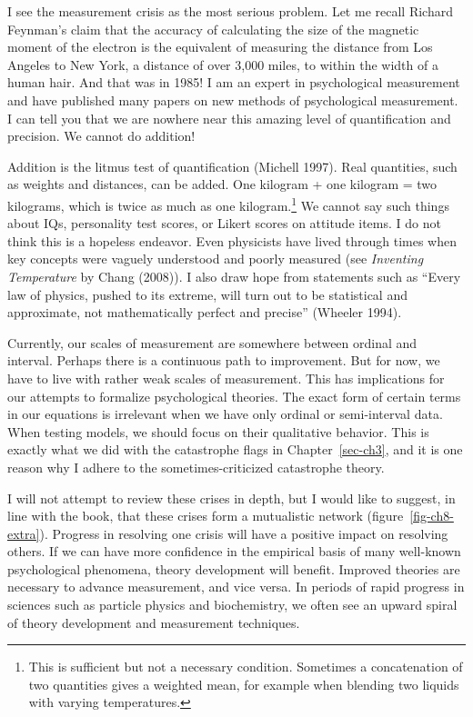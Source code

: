 \documentclass[
  a4paper,
  DIV=11,
  numbers=noendperiod,
  oneside]{scrreprt}
\begin{document}
I see the measurement crisis as the most serious problem. Let me recall
Richard Feynman's claim that the accuracy of calculating the size of the
magnetic moment of the electron is the equivalent of measuring the
distance from Los Angeles to New York, a distance of over 3,000 miles,
to within the width of a human hair. And that was in 1985! I am an
expert in psychological measurement and have published many papers on
new methods of psychological measurement. I can tell you that we are
nowhere near this amazing level of quantification and precision. We
cannot do addition!

Addition is the litmus test of quantification (Michell 1997). Real
quantities, such as weights and distances, can be added. One kilogram +
one kilogram = two kilograms, which is twice as much as one
kilogram.\footnote{This is sufficient but not a necessary condition.
  Sometimes a concatenation of two quantities gives a weighted mean, for
  example when blending two liquids with varying temperatures.} We
cannot say such things about IQs, personality test scores, or Likert
scores on attitude items. I do not think this is a hopeless endeavor.
Even physicists have lived through times when key concepts were vaguely
understood and poorly measured (see \emph{Inventing Temperature} by
Chang (2008)). I also draw hope from statements such as ``Every law of
physics, pushed to its extreme, will turn out to be statistical and
approximate, not mathematically perfect and precise'' (Wheeler 1994).

Currently, our scales of measurement are somewhere between ordinal and
interval. Perhaps there is a continuous path to improvement. But for
now, we have to live with rather weak scales of measurement. This has
implications for our attempts to formalize psychological theories. The
exact form of certain terms in our equations is irrelevant when we have
only ordinal or semi-interval data. When testing models, we should focus
on their qualitative behavior. This is exactly what we did with the
catastrophe flags in Chapter~\ref{sec-ch3}, and it is one reason why I
adhere to the sometimes-criticized catastrophe theory.

I will not attempt to review these crises in depth, but I would like to
suggest, in line with the book, that these crises form a mutualistic
network (figure~\ref{fig-ch8-extra}). Progress in resolving one crisis
will have a positive impact on resolving others. If we can have more
confidence in the empirical basis of many well-known psychological
phenomena, theory development will benefit. Improved theories are
necessary to advance measurement, and vice versa. In periods of rapid
progress in sciences such as particle physics and biochemistry, we often
see an upward spiral of theory development and measurement techniques.
\end{document}
